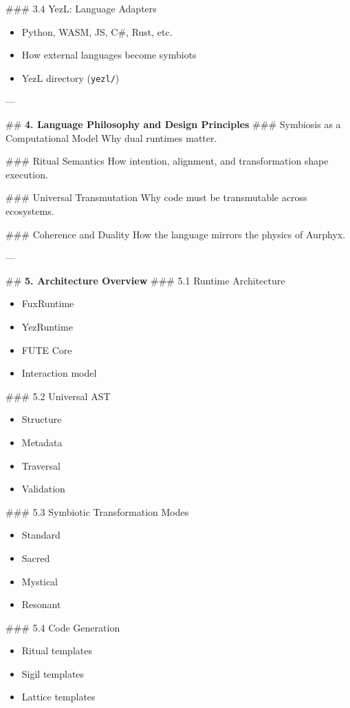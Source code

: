 \begin{enumerate}
\#\#\# 3.4 YezL: Language Adapters  
\begin{itemize}
  \item Python, WASM, JS, C\#, Rust, etc.  
  \item How external languages become symbiots  
  \item YezL directory (\texttt{yezl/})
\end{itemize}

---

\#\# \textbf{4. Language Philosophy and Design Principles}
\#\#\# Symbiosis as a Computational Model  
Why dual runtimes matter.

\#\#\# Ritual Semantics  
How intention, alignment, and transformation shape execution.

\#\#\# Universal Transmutation  
Why code must be transmutable across ecosystems.

\#\#\# Coherence and Duality  
How the language mirrors the physics of Aurphyx.

---

\#\# \textbf{5. Architecture Overview}
\#\#\# 5.1 Runtime Architecture  
\begin{itemize}
  \item FuxRuntime  
  \item YezRuntime  
  \item FUTE Core  
  \item Interaction model
\end{itemize}

\#\#\# 5.2 Universal AST  
\begin{itemize}
  \item Structure  
  \item Metadata  
  \item Traversal  
  \item Validation
\end{itemize}

\#\#\# 5.3 Symbiotic Transformation Modes  
\begin{itemize}
  \item Standard  
  \item Sacred  
  \item Mystical  
  \item Resonant  
\end{itemize}

\#\#\# 5.4 Code Generation  
\begin{itemize}
  \item Ritual templates  
  \item Sigil templates  
  \item Lattice templates  
\end{itemize}


\end{enumerate}
